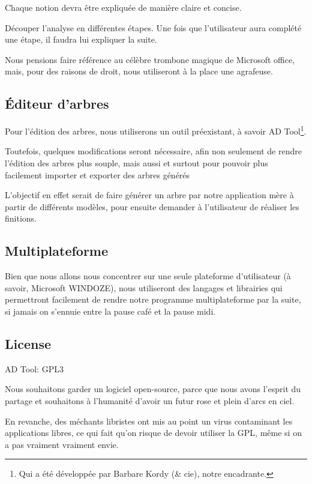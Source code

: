         Chaque notion devra être expliquée de manière claire et concise.
        
        Découper l'analyse en différentes étapes. Une fois que l'utilisateur aura complété une étape, il faudra lui expliquer la suite.
        
        Nous pensions faire référence au célèbre trombone magique de Microsoft office, mais, pour des raisons de droit, nous utiliseront à la place une agrafeuse.
        
    \subsection{\'Editeur d'arbres}
        Pour l'édition des arbres, nous utiliserons un outil préexistant, à savoir AD Tool\footnote{Qui a été développée par Barbare Kordy (\& cie), notre encadrante.}.
        
        Toutefois, quelques modifications seront nécessaire, afin non seulement de rendre l'édition des arbres plus souple, mais aussi et surtout pour pouvoir plus facilement importer et exporter des arbres générés
        
        L'objectif en effet serait de faire générer un arbre par notre application mère à partir de différents modèles, pour ensuite demander à l'utilisateur de réaliser les finitions.
    
	\subsection{Multiplateforme}
        Bien que nous allons nous concentrer sur une seule plateforme d'utilisateur (à savoir, Microsoft WINDOZE), nous utiliseront des langages et librairies qui permettront facilement de rendre notre programme multiplateforme par la suite, si jamais on s’ennuie entre la pause café et la pause midi.

    \subsection{License}
    	AD Tool: GPL3
        
        Nous souhaitons garder un logiciel open-source, parce que nous avons l'esprit du partage et souhaitons à l'humanité d'avoir un futur rose et plein d'arcs en ciel.
        
        En revanche, des méchants libristes ont mis au point un virus contaminant les applications libres, ce qui fait qu'on risque de devoir utiliser la GPL, même si on a pas vraiment vraiment envie.